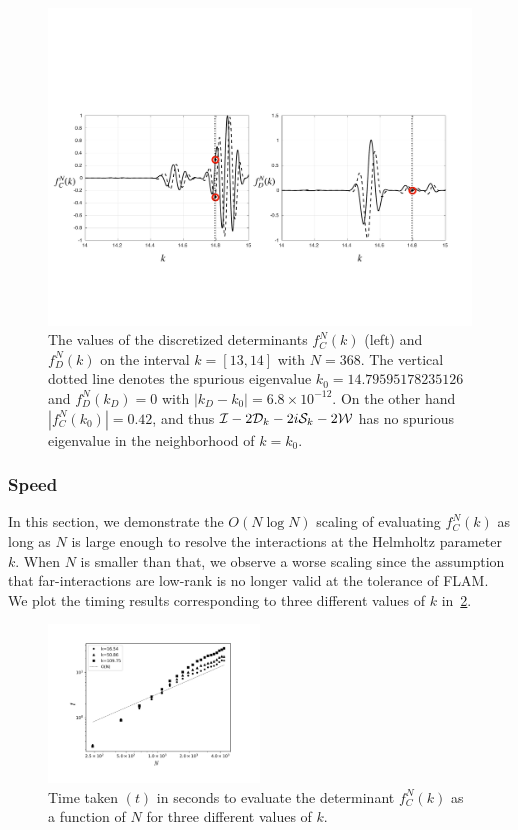 \begin{figure}
\centering
\includegraphics[width=0.98\linewidth]{media/det_spur.pdf}
\caption{The values of the discretized determinants $f_{C}^{N}(k)$ (left)
and $f_{D}^{N}(k)$ on the interval $k=[13,14]$ with $N=368$. The vertical
dotted line denotes the spurious eigenvalue $k_{0} = 14.79595178235126$ 
and $f_{D}^{N}(k_{D}) = 0$ with $|k_{D}-k_{0}|=6.8\times 10^{-12}$.
On the other hand $|f_{C}^{N}(k_{0})|=0.42$, and thus $\mathcal I-2{\mathcal D}_{k}-2i{\mathcal S}_{k} 
-2{\mathcal W}$ has no 
spurious eigenvalue in the neighborhood of $k=k_{0}$.}
\label{fig:spur}
\end{figure}

\subsubsection{Speed}
\label{subsec:speed}
In this section, we demonstrate the $O(N\log{N})$ scaling of evaluating
$f^{N}_{C}(k)$ as long as $N$ is large enough to resolve the interactions
at the Helmholtz parameter $k$. 
When $N$ is smaller than that, we observe a worse scaling since the
assumption that far-interactions are low-rank is no longer valid at
the tolerance of FLAM.
We plot the timing results corresponding to three different values of 
$k$ in~\cref{fig:speed}.
\begin{figure}
\centering
\includegraphics[width=0.5\textwidth]{media/speed_res.pdf}
\caption{Time taken $(t)$ in seconds to evaluate the determinant $f_{C}^{N}(k)$ as
a function of $N$ for three different values of $k$.}
\label{fig:speed}
\end{figure}

